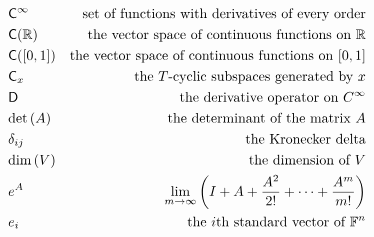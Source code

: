 \begin{align*}
	 & \mathsf{C}^\infty                 & \text{set of functions with derivatives of every order}                          \\
	 & \mathsf{C}(\mathbb{R})                    & \text{the vector space of continuous functions on $\mathbb{R}$}                          \\
	 & \mathsf{C}([0,1])                 & \text{the vector space of continuous functions on $[0,1]$}                       \\
	 & \mathsf{C}_x                      & \text{the $T$-cyclic subspaces generated by $x$}                                 \\
	 & \mathsf{D}                        & \text{the derivative operator on $C^\infty$}                                     \\
	 & \text{det}\left(A\right)                          & \text{the determinant of the matrix $A$}                                         \\
	 & \delta_{ij}                       & \text{the Kronecker delta}                                                       \\
	 & \text{dim}\left(V\right)                          & \text{the dimension of $V$}                                                      \\
	 & e^A                               & \lim_{m \to \infty} \left(I + A + \frac{A^2}{2!} + \dots + \frac{A^m}{m!}\right) \\
	 & e_i                               & \text{the $i$th standard vector of $\mathbb{F}^n$}                                       \\
\end{align*}
